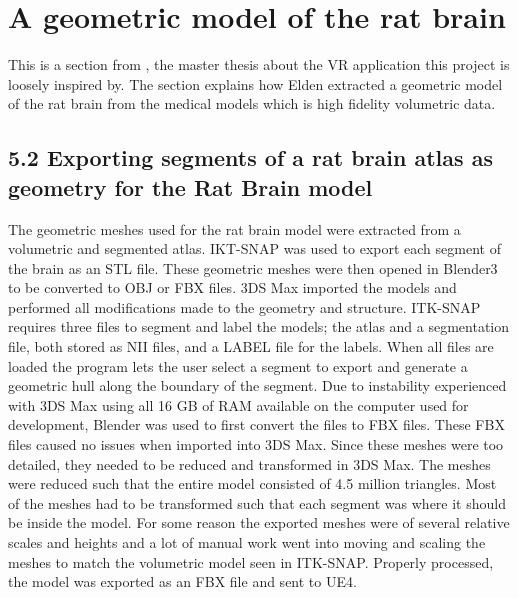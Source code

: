 
\chapter{A geometric model of the rat brain}

This is a section from \citet{Elden2017}, the master thesis about  the VR application this project is loosely inspired by. The section explains how Elden extracted a geometric model of the rat brain from the medical models which is high fidelity volumetric data.

\section*{5.2 Exporting segments of a rat brain atlas as geometry
for the Rat Brain model}
The geometric meshes used for the rat brain model were extracted from
a volumetric and segmented atlas. IKT-SNAP was used to export each
segment of the brain as an STL file. These geometric meshes were then
opened in Blender3
to be converted to OBJ or FBX files. 3DS Max imported
the models and performed all modifications made to the geometry and
structure.
ITK-SNAP requires three files to segment and label the models; the
atlas and a segmentation file, both stored as NII files, and a LABEL file
for the labels. When all files are loaded the program lets the user select a
segment to export and generate a geometric hull along the boundary of the
segment. Due to instability experienced with 3DS Max using all 16 GB of
RAM available on the computer used for development, Blender was used
to first convert the files to FBX files. These FBX files caused no issues when
imported into 3DS Max. Since these meshes were too detailed, they needed
to be reduced and transformed in 3DS Max. The meshes were reduced
such that the entire model consisted of 4.5 million triangles. Most of the
meshes had to be transformed such that each segment was where it should
be inside the model. For some reason the exported meshes were of several
relative scales and heights and a lot of manual work went into moving
and scaling the meshes to match the volumetric model seen in ITK-SNAP.
Properly processed, the model was exported as an FBX file and sent to UE4.

